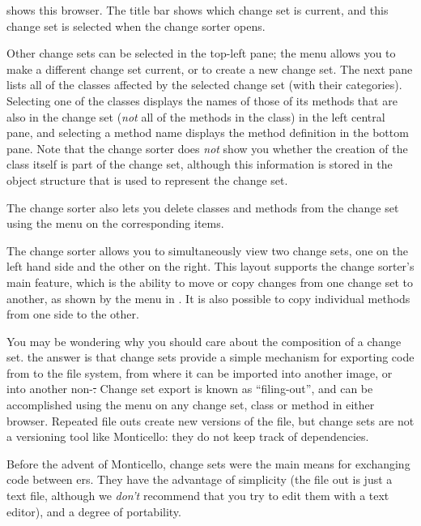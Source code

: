 \documentclass[a4paper,10pt,twoside]{book}
\begin{document}
 shows this browser.  The title bar shows which change set is current, and this change set is selected when the change sorter opens. 

Other change sets can be selected in the top-left pane; the \actclick menu allows you to make a different change set current, or to create a new change set.
The next pane lists all of the classes affected by the selected change set (with their categories).
Selecting one of the classes displays the names of those of its methods that are also in the change set (\emph{not} all of the methods in the class) in the left central pane, and selecting a method name displays the method definition in the bottom pane.
Note that the change sorter does \emph{not} show you whether the creation of the class itself is part of the change set, although this information is stored in the object structure that is used to represent the change set.

The change sorter also lets you delete classes and methods from the change set using the \actclick menu on the corresponding items.

The change sorter allows you to simultaneously view two change sets, one on the left hand side and the other on the right.
This layout supports the change sorter's main feature, which is the ability to move or copy changes from one change set to another, as shown by the \actclick menu in .
It is also possible to copy individual methods from one side to the other.

You may be wondering why you should care about the composition of a change set.
the answer is that change sets provide a simple mechanism for exporting code from \pharo to the file system, from where it can be imported into another \pharo image, or into another non-\pharo \st.
Change set export is known as ``filing-out'', and can be accomplished using the \actclick menu on any change set, class or method in either browser.
Repeated file outs create new versions of the file, but change sets are not a versioning tool like Monticello:
they do not keep track of dependencies.

Before the advent of Monticello, change sets were the main means for exchanging code between \pharo{}ers.
They have the advantage of simplicity (the file out is just a text file, although we \emph{don't} recommend that you try to edit them with a text editor), and a degree of portability.  
\end{document}
